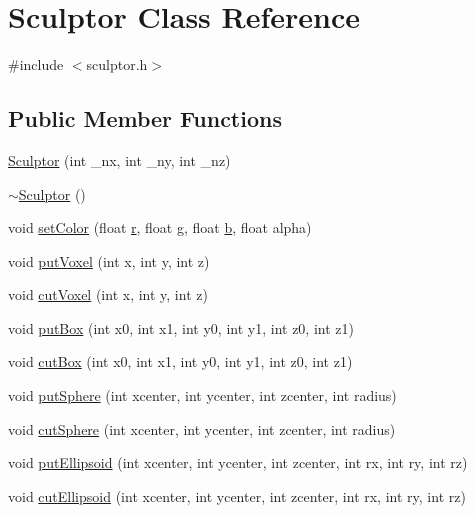 \hypertarget{class_sculptor}{}\section{Sculptor Class Reference}
\label{class_sculptor}


{\ttfamily \#include $<$sculptor.\+h$>$}

\subsection*{Public Member Functions}
\begin{DoxyCompactItemize}
\item 
\mbox{\hyperlink{class_sculptor_a014e3ef5517bf0e9d9e14486b6ac6433}{Sculptor}} (int \+\_\+nx, int \+\_\+ny, int \+\_\+nz)
\item 
\mbox{\hyperlink{class_sculptor_a8f159bf97458326f16d2e238e11be7ff}{$\sim$\+Sculptor}} ()
\item 
void \mbox{\hyperlink{class_sculptor_af1d69da01379874b0dfd6454787cb562}{set\+Color}} (float \mbox{\hyperlink{class_sculptor_a3f5d2ec3b66d645019b8d81c810a1cd8}{r}}, float \mbox{\hyperlink{class_sculptor_a208c06af69a81a1568df4493868816f1}{g}}, float \mbox{\hyperlink{class_sculptor_a7aafd7305ea634252d8288b60536cd96}{b}}, float alpha)
\item 
void \mbox{\hyperlink{class_sculptor_a4bdea3048b419d58e93074060eaa7b52}{put\+Voxel}} (int x, int y, int z)
\item 
void \mbox{\hyperlink{class_sculptor_ad9d714a35fc8ae16d06eb5df37c3493c}{cut\+Voxel}} (int x, int y, int z)
\item 
void \mbox{\hyperlink{class_sculptor_a311ad7a0fb83fc67ac1f378be8e99fe1}{put\+Box}} (int x0, int x1, int y0, int y1, int z0, int z1)
\item 
void \mbox{\hyperlink{class_sculptor_aa84a1b12b09e9e103fc8d78f8d1bc00f}{cut\+Box}} (int x0, int x1, int y0, int y1, int z0, int z1)
\item 
void \mbox{\hyperlink{class_sculptor_a794a2b6ee8fc8098fd6150cb46101fc6}{put\+Sphere}} (int xcenter, int ycenter, int zcenter, int radius)
\item 
void \mbox{\hyperlink{class_sculptor_a67ab8c0ba5116adb8af1d01ad373ac15}{cut\+Sphere}} (int xcenter, int ycenter, int zcenter, int radius)
\item 
void \mbox{\hyperlink{class_sculptor_a093615b0c2b9b3a17a56300b9b939f39}{put\+Ellipsoid}} (int xcenter, int ycenter, int zcenter, int rx, int ry, int rz)
\item 
void \mbox{\hyperlink{class_sculptor_a18d2922c111c4c13653ee07d878151ad}{cut\+Ellipsoid}} (int xcenter, int ycenter, int zcenter, int rx, int ry, int rz)
\end{DoxyCompactItemize}
